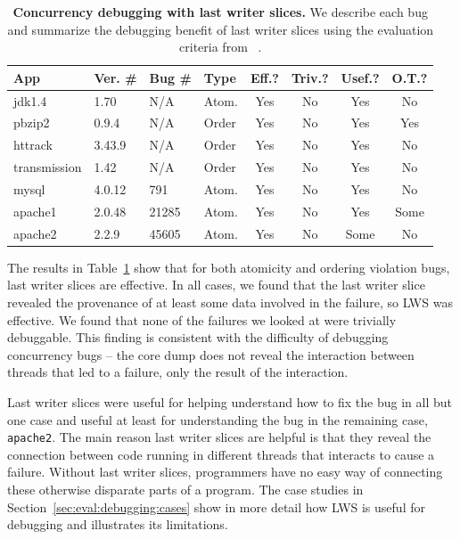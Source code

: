\documentclass[10pt,nocopyrightspace]{sigplanconf}
\newcommand{\lws}{LWS\xspace}
\newcommand{\Caption}[1]{\begin{minipage}{.95\columnwidth} \caption{#1} \end{minipage} \vspace{-1.2ex}}
\begin{document}
\begin{table}
\scriptsize
\centering
\begin{tabular}{l|ll|l|ccc|c}
{\bf App} & {\bf Ver. \#} & {\bf Bug \#} &{\bf Type} & {\bf Eff.?} & {\bf Triv.?} & {\bf Usef.?} & {\bf O.T.?}\\ \hline
jdk1.4 &  1.70   &  N/A     & Atom.  &Yes  &No    &Yes   & No  \\%
pbzip2 &  0.9.4  &  N/A     & Order  &Yes  &No    &Yes   & Yes \\
httrack& 3.43.9  &  N/A     & Order  &Yes  &No    &Yes   & No  \\%
transmission & 1.42 & N/A   & Order  &Yes  &No    &Yes   & No  \\
mysql  &  4.0.12 &  791     & Atom.  &Yes  &No    &Yes   & No  \\%
apache1&  2.0.48 &  21285   & Atom.  &Yes  &No    &Yes   & Some \\%
apache2&  2.2.9 &  45605    & Atom.  &Yes  &No    &Some  & No \\%
\end{tabular}
\Caption{\label{tab:bugs}{\bf Concurrency debugging with last writer slices.} We describe each bug and summarize the debugging benefit of last writer slices using the evaluation criteria from ~\cite{badapples}.  }
\normalsize
\end{table}

The results in Table~\ref{tab:bugs} show that for both atomicity and ordering
violation bugs, last writer slices are effective.  In all cases, we found that
the last writer slice revealed the provenance of at least some data involved in
the failure, so \lws was effective.  We found that none of the
failures we looked at were trivially debuggable.  This finding is consistent
with the difficulty of debugging concurrency bugs -- the core dump does not
reveal the interaction between threads that led to a failure, only the result
of the interaction.  

Last writer slices were useful for helping understand how to fix the bug in
all but one case and useful at least for understanding the bug in the
remaining case, {\tt apache2}.  The main reason last writer slices are helpful
is that they reveal the connection between code running in different threads
that interacts to cause a failure.  Without last writer slices, programmers
have no easy way of connecting these otherwise disparate parts of a program.
The case studies in Section~\ref{sec:eval:debugging:cases} show in more detail
how \lws is useful for debugging and illustrates its limitations.
\end{document}
